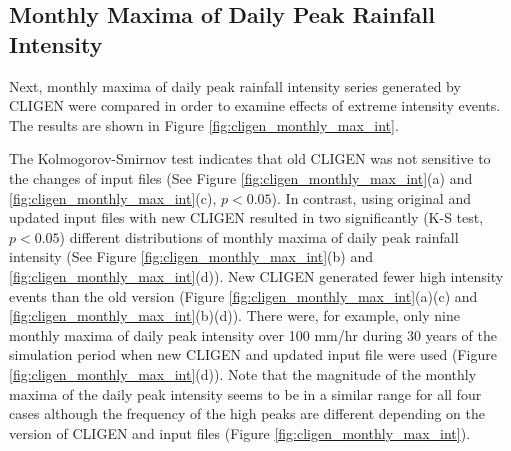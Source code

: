 \subsection{Monthly Maxima of Daily Peak Rainfall Intensity}
Next, monthly maxima of daily peak rainfall intensity series generated by CLIGEN
were compared in order to examine effects of extreme intensity events. The
results are shown in Figure \ref{fig:cligen_monthly_max_int}.

The Kolmogorov-Smirnov test indicates that old CLIGEN was not sensitive to the
changes of input files (See Figure \ref{fig:cligen_monthly_max_int}(a) and
\ref{fig:cligen_monthly_max_int}(c), $p<0.05$). In contrast, using original and
updated input files with new CLIGEN resulted in two significantly (K-S test,
$p<0.05$) different distributions of monthly maxima of daily peak rainfall
intensity (See Figure \ref{fig:cligen_monthly_max_int}(b) and
\ref{fig:cligen_monthly_max_int}(d)).
New CLIGEN generated fewer high intensity events than the old version (Figure
\ref{fig:cligen_monthly_max_int}(a)(c) and
\ref{fig:cligen_monthly_max_int}(b)(d)). There were, for example, only nine
monthly maxima of daily peak intensity over 100 mm/hr during 30 years of the
simulation period when new CLIGEN and updated input file were used (Figure
\ref{fig:cligen_monthly_max_int}(d)). Note that the magnitude of the monthly
maxima of the daily peak intensity seems to be in a similar range for all four
cases although the frequency of the high peaks are different depending on the
version of CLIGEN and input files (Figure \ref{fig:cligen_monthly_max_int}).

